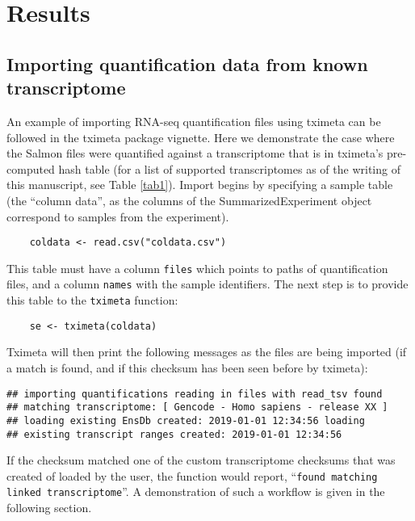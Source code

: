 \documentclass[12pt]{article} \usepackage[utf8]{inputenc}
\begin{document}
\section*{Results}

\subsection*{Importing quantification data from known transcriptome}

An example of importing RNA-seq quantification files using tximeta can
be followed in the tximeta package vignette. Here we demonstrate the
case where the Salmon files were quantified against a transcriptome
that is in tximeta's pre-computed hash table (for a list of supported
transcriptomes as of the writing of this manuscript, see Table
\ref{tab1}). Import begins by specifying a sample table (the ``column
data'', as the columns of the SummarizedExperiment object correspond
to samples from the experiment).

\begin{verbatim}
    coldata <- read.csv("coldata.csv")
\end{verbatim}

This table must have a column \texttt{files} which points to paths of
quantification files, and a column \texttt{names} with the sample
identifiers. The next step is to provide this table to the
\texttt{tximeta} function:

\begin{verbatim}
    se <- tximeta(coldata)
\end{verbatim}

Tximeta will then print the following messages as the files are being
imported (if a match is found, and if this checksum has been seen
before by tximeta):

\begin{verbatim}
## importing quantifications reading in files with read_tsv found
## matching transcriptome: [ Gencode - Homo sapiens - release XX ]
## loading existing EnsDb created: 2019-01-01 12:34:56 loading
## existing transcript ranges created: 2019-01-01 12:34:56
\end{verbatim}

If the checksum matched one of the custom transcriptome checksums that
was created of loaded by the user, the function would report,
``\texttt{found matching linked transcriptome}''. A demonstration of
such a workflow is given in the following section.
\end{document}
